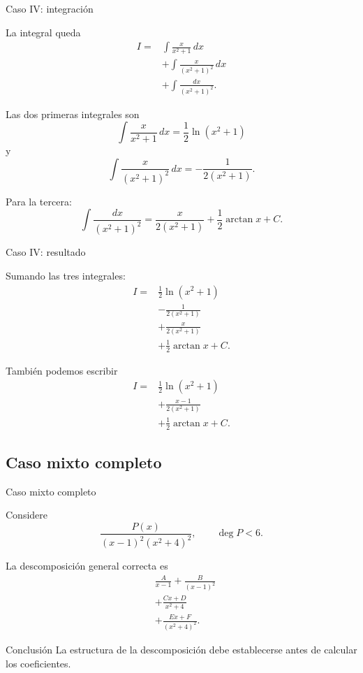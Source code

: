 \documentclass[10pt,aspectratio=169]{beamer}
\begin{document}
\begin{frame}{Caso IV: integración}
\small

La integral queda
\[
\begin{aligned}
I={}&\int\frac{x}{x^2+1}\,dx\\
&+\int\frac{x}{(x^2+1)^2}\,dx\\
&+\int\frac{dx}{(x^2+1)^2}.
\end{aligned}
\]

Las dos primeras integrales son
\[
\int\frac{x}{x^2+1}\,dx
=\frac12\ln(x^2+1)
\]
y
\[
\int\frac{x}{(x^2+1)^2}\,dx
=-\frac1{2(x^2+1)}.
\]

Para la tercera:
\[
\int\frac{dx}{(x^2+1)^2}
=
\frac{x}{2(x^2+1)}
+\frac12\arctan x+C.
\]
\end{frame}

\begin{frame}{Caso IV: resultado}
\small

Sumando las tres integrales:
\[
\boxed{
\begin{aligned}
I={}&\frac12\ln(x^2+1)\\
&-\frac1{2(x^2+1)}\\
&+\frac{x}{2(x^2+1)}\\
&+\frac12\arctan x+C.
\end{aligned}
}
\]

También podemos escribir
\[
\boxed{
\begin{aligned}
I={}&\frac12\ln(x^2+1)\\
&+\frac{x-1}{2(x^2+1)}\\
&+\frac12\arctan x+C.
\end{aligned}
}
\]
\end{frame}

\subsection{Caso mixto completo}

\begin{frame}{Caso mixto completo}
\small

Considere
\[
\frac{P(x)}{(x-1)^2(x^2+4)^2},
\qquad \deg P<6.
\]

La descomposición general correcta es
\[
\boxed{
\begin{aligned}
&\frac{A}{x-1}
+\frac{B}{(x-1)^2}\\
&+\frac{Cx+D}{x^2+4}\\
&+\frac{Ex+F}{(x^2+4)^2}.
\end{aligned}
}
\]

\begin{block}{Conclusión}
La estructura de la descomposición
debe establecerse antes de calcular
los coeficientes.
\end{block}
\end{frame}
\end{document}
